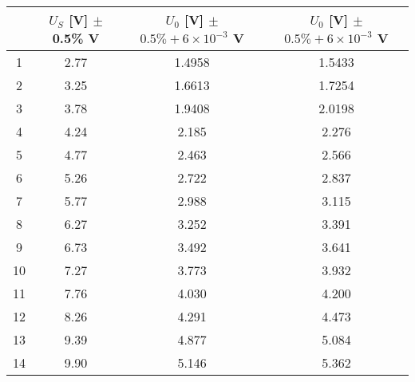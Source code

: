 \begin{tabular}{|c|c|c|c|}
\hline
&$U_S$ [V] $\pm$ 0.5\% V & $U_0$ [V] $\pm$ $0.5\% +6\times10^{-3}$ V &$U_0$ [V] $\pm$ $0.5\% +6\times10^{-3}$ V\\
\hline
1	&	2.77	&	1.4958	&	1.5433	\\
\hline
2	&	3.25	&	1.6613	&	1.7254	\\
\hline
3	&	3.78	&	1.9408	&	2.0198	\\
\hline
4	&	4.24	&	2.185	&	2.276	\\
\hline
5	&	4.77	&	2.463	&	2.566	\\
\hline
6	&	5.26	&	2.722	&	2.837	\\
\hline
7	&	5.77	&	2.988	&	3.115	\\
\hline
8	&	6.27	&	3.252	&	3.391	\\
\hline
9	&	6.73	&	3.492	&	3.641	\\
\hline
10	&	7.27	&	3.773	&	3.932	\\
\hline
11	&	7.76	&	4.030	&	4.200	\\
\hline
12	&	8.26	&	4.291	&	4.473	\\
\hline
13	&	9.39	&	4.877	&	5.084	\\
\hline
14	&	9.90	&	5.146	&	5.362	\\
\hline
\end{tabular}
